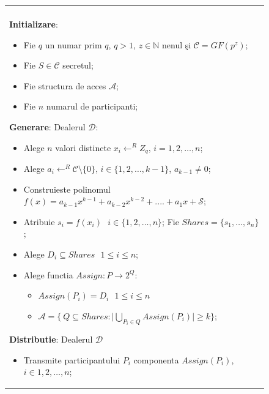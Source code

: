 \documentclass{llncs}
\begin{document}
\begin{figure}[h!]

\begin{tabular}{|p{\textwidth}|}
\hline

\\
\hspace{.1in}
\textbf{Initializare}: 
	\begin{itemize}
		\item Fie $q$ un numar prim $q$, $q > 1$, $z \in \mathbb{N}$ nenul \c{s}i $\mathcal{C} = GF(p^z)$;
		\item Fie $S \in \mathcal{C}$ secretul; 
		\item Fie structura de acces $\mathcal{A}$;
		\item Fie $n$ numarul de participanti;
	\end{itemize}

\medskip

\hspace{.1in}
\textbf{Generare}: Dealerul $\mathcal{D}$:
	\begin{itemize}
		\setlength{\itemsep}{5pt}
		\item Alege $n$ valori distincte $x_i \leftarrow^R Z_q \text{, }i = 1,2,\dots,n$;
		\item Alege $a_{i} \leftarrow^R \mathcal{C} \setminus \{0\} \text{, }i \in \{1,2,\dots,{k - 1}\}$, $a_{k-1} \neq 0$;
		\item Construieste polinomul $f(x) = a_{k - 1}x ^ {k-1} + a_{k-2}x ^ {k - 2} + .... + a_1x + \mathcal{S}$;
		\item Atribuie $s_i = f(x_i) \text{ } i \in \{1,2,\dots,n\}$; Fie $Shares = \{ s_1, \dots, s_n \}$;
		\item Alege $D_i \subseteq Shares \text{ } 1 \leq i \leq n$;
		\item Alege functia $Assign: P \rightarrow 2^Q$:
			\begin{itemize}
				\item $Assign(P_i) = D_i \text{ } 1 \leq i \leq n$
				\item $\mathcal{A} = \bigg \{ \ Q \subseteq Shares: \bigg| \underset{P_i \in Q}{{\bigcup}} Assign(P_i) \bigg| \geq k \bigg \}$;
			\end{itemize}
	\end{itemize}
\medskip

\hspace{.1in}
\textbf{Distributie}: Dealerul $\mathcal{D}$
	\begin{itemize}
		\item Transmite participantului $P_i$ componenta $Assign(P_i)$, $i \in 1,2,\dots,n$;
	\end{itemize}


\end{tabular}
\end{figure}
\end{document}

